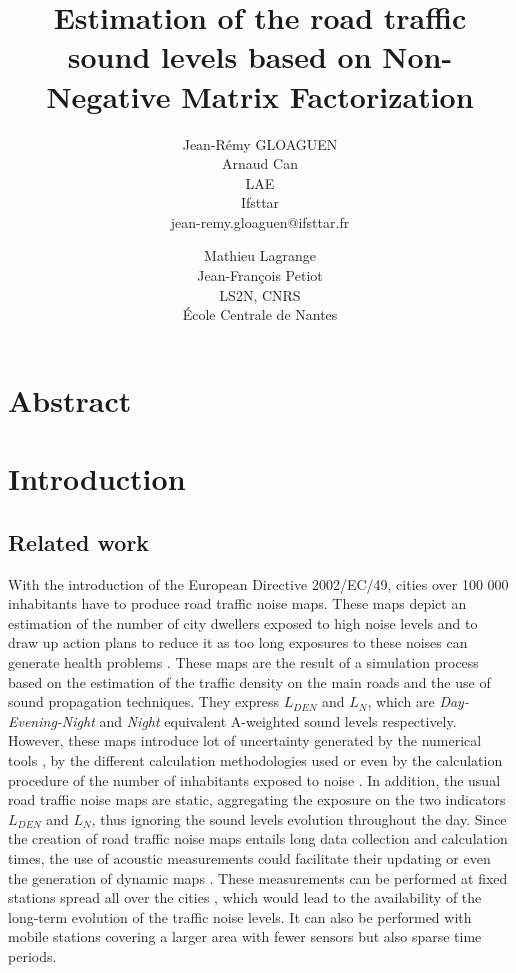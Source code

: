 \documentclass[twocolumn,a4paper,10pt]{article}
\title{Estimation of the road traffic sound levels based on Non-Negative Matrix Factorization}
\author{
    Jean-Rémy GLOAGUEN\\
    Arnaud Can\\
    LAE\\
    Ifsttar\\
    jean-remy.gloaguen@ifsttar.fr
  \and
    Mathieu Lagrange\\
	Jean-François Petiot \\
    LS2N, CNRS\\
    \'Ecole Centrale de  Nantes\\
}
\date{}
\begin{document}
\maketitle

\section*{Abstract}

\section{Introduction}
\subsection{Related work}
With the introduction of the European Directive 2002/EC/49, cities over 100 000 inhabitants have to produce road traffic noise maps. These maps depict an estimation of the number of city dwellers exposed to high noise levels and to draw up action plans to reduce it as too long exposures to these noises can generate health problems \cite{who_burden_2017}. These maps are the result of a simulation process based on the estimation of the traffic density on the main roads and the use of sound propagation techniques. They express $L_ {DEN}$ and $L_N$, which are \textit{Day-Evening-Night} and \textit{Night} equivalent A-weighted sound levels respectively. However, these maps introduce lot of uncertainty generated by the numerical tools \cite{van_leeuwen_noise_2015}, by the different calculation methodologies used \cite{leroy_uncertainty_2010}\cite{garg_critical_2014} or even by the calculation procedure of the number of inhabitants exposed to noise \cite{king_implementation_2011}. In addition, the usual road traffic noise maps are static, aggregating the exposure on the two indicators $L_{DEN}$ and $L_N$, thus ignoring the sound levels evolution throughout the day. Since the creation of road traffic noise maps entails long data collection and calculation times, the use of acoustic measurements could facilitate their updating or even the generation of dynamic maps \cite{wei_dynamic_2016}. These measurements can be performed at fixed stations spread all over the cities \cite{Mioduszewski} \cite{mietlicki2012innovative}, which would lead to the availability of the long-term evolution of the traffic noise levels. It can also be performed with  mobile stations \cite{can_exploring_2012} \cite{manvell2004sadmam} covering a larger area with fewer sensors but also sparse time periods. 
\end{document}
